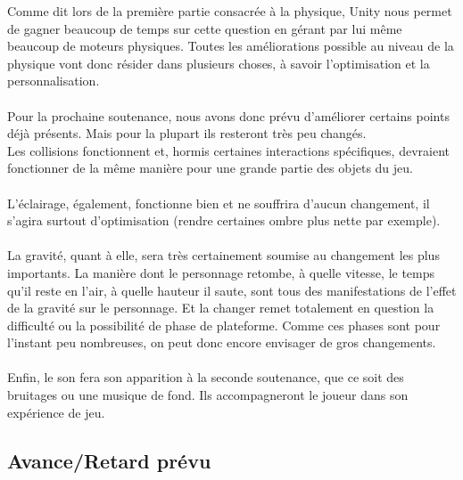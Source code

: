 \documentclass[a4paper]{article}
\begin{document}
Comme dit lors de la première partie consacrée à la physique, Unity nous permet de gagner beaucoup de temps sur cette question en gérant par lui même beaucoup de moteurs physiques. Toutes les améliorations possible au niveau de la physique vont donc résider dans plusieurs choses, à savoir l'optimisation et la personnalisation.\\
\\
Pour la prochaine soutenance, nous avons donc prévu d'améliorer certains points déjà présents. Mais pour la plupart ils resteront très peu changés.  \\
Les collisions fonctionnent et, hormis certaines interactions spécifiques, devraient fonctionner de la même manière pour une grande partie des objets du jeu.\\
\\
L'éclairage, également, fonctionne bien et ne souffrira d'aucun changement, il s'agira surtout d'optimisation (rendre certaines ombre plus nette par exemple).\\
\\
La gravité, quant à elle, sera très certainement soumise au changement les plus importants. La manière dont le personnage  retombe, à quelle vitesse, le temps qu'il reste en l'air, à quelle hauteur il saute, sont tous des manifestations de l'effet de la gravité sur le personnage. Et la changer remet totalement en question la difficulté ou la possibilité de phase de plateforme. Comme ces phases sont pour l'instant peu nombreuses, on peut donc encore envisager de gros changements.\\
\\
Enfin, le son fera son apparition à la seconde soutenance, que ce soit des bruitages ou une musique de fond. Ils accompagneront le joueur dans son expérience de jeu.

\pagebreak

\subsection{Avance/Retard prévu}
\vspace{0.5 cm}
\end{document}
